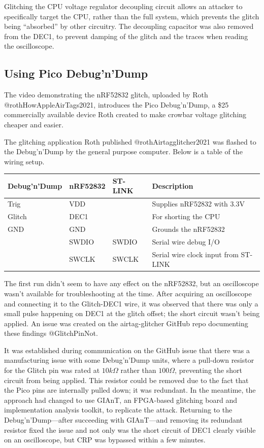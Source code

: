 Glitching the CPU voltage regulator decoupling circuit allows an
attacker to specifically target the CPU, rather than the full system,
which prevents the glitch being ``absorbed'' by other circuitry. The
decoupling capacitor was also removed from the DEC1, to prevent damping
of the glitch and the traces when reading the oscilloscope.

\hypertarget{using-pico-debugndump}{%
\subsection{\texorpdfstring{Using Pico
Debug'n'Dump\label{section_nrf52832_debugndump}}{Using Pico Debug'n'Dump}}\label{using-pico-debugndump}}

The video demonstrating the nRF52832 glitch, uploaded by Roth
@rothHowAppleAirTags2021, introduces the Pico Debug'n'Dump, a \$25
commercially available device Roth created to make crowbar voltage
glitching cheaper and easier.

The glitching application Roth published @rothAirtagglitcher2021 was
flashed to the Debug'n'Dump by the general purpose computer. Below is a
table of the wiring setup.

\begin{longtable}[]{@{}llll@{}}
\toprule
Debug'n'Dump & nRF52832 & ST-LINK & Description \\
\midrule
\endhead
Trig & VDD & & Supplies nRF52832 with 3.3V \\
Glitch & DEC1 & & For shorting the CPU \\
GND & GND & & Grounds the nRF52832 \\
& SWDIO & SWDIO & Serial wire debug I/O \\
& SWCLK & SWCLK & Serial wire clock input from ST-LINK \\
\bottomrule
\end{longtable}

The first run didn't seem to have any effect on the nRF52832, but an
oscilloscope wasn't available for troubleshooting at the time. After
acquiring an oscilloscope and connecting it to the Glitch-DEC1 wire, it
was observed that there was only a small pulse happening on DEC1 at the
glitch offset; the short circuit wasn't being applied. An issue was
created on the airtag-glitcher GitHub repo documenting these findings
@GlitchPinNot.

It was established during communication on the GitHub issue that there
was a manufacturing issue with some Debug'n'Dump units, where a
pull-down resistor for the Glitch pin was rated at \(10k \Omega\) rather
than \(100 \Omega\), preventing the short circuit from being applied.
This resistor could be removed due to the fact that the Pico pins are
internally pulled down; it was redundant. In the meantime, the approach
had changed to use GIAnT, an FPGA-based glitching board and
implementation analysis toolkit, to replicate the attack. Returning to
the Debug'n'Dump---after succeeding with GIAnT---and removing its
redundant resistor fixed the issue and not only was the short circuit of
DEC1 clearly visible on an oscilloscope, but CRP was bypassed within a
few minutes.

